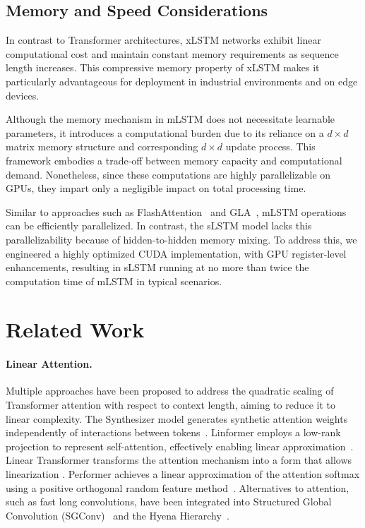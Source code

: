 \subsection{Memory and Speed Considerations}

In contrast to Transformer architectures, xLSTM networks exhibit linear computational cost and maintain constant memory requirements as sequence length increases. This compressive memory property of xLSTM makes it particularly advantageous for deployment in industrial environments and on edge devices.

Although the memory mechanism in mLSTM does not necessitate learnable parameters, it introduces a computational burden due to its reliance on a $d \times d$ matrix memory structure and corresponding $d \times d$ update process. This framework embodies a trade-off between memory capacity and computational demand. Nonetheless, since these computations are highly parallelizable on GPUs, they impart only a negligible impact on total processing time.

Similar to approaches such as FlashAttention~\citep{Dao:22,Dao:23} and GLA~\citep{Yang:23arxiv}, mLSTM operations can be efficiently parallelized. In contrast, the sLSTM model lacks this parallelizability because of hidden-to-hidden memory mixing. To address this, we engineered a highly optimized CUDA implementation, with GPU register-level enhancements, resulting in sLSTM running at no more than twice the computation time of mLSTM in typical scenarios.

\section{Related Work}
\label{sec:related}

\paragraph{Linear Attention.} Multiple approaches have been proposed to address the quadratic scaling of Transformer attention with respect to context length, aiming to reduce it to linear complexity. The Synthesizer model generates synthetic attention weights independently of interactions between tokens~\citep{Tay:20arxiv}. Linformer employs a low-rank projection to represent self-attention, effectively enabling linear approximation~\citep{Wang:20arxiv}. Linear Transformer transforms the attention mechanism into a form that allows linearization \citep{Katharopoulos:20}. Performer achieves a linear approximation of the attention softmax using a positive orthogonal random feature method~\citep{Choromanski:21}. Alternatives to attention, such as fast long convolutions, have been integrated into Structured Global Convolution (SGConv)~\citep{Li:22} and the Hyena Hierarchy~\citep{Poli:23}.

